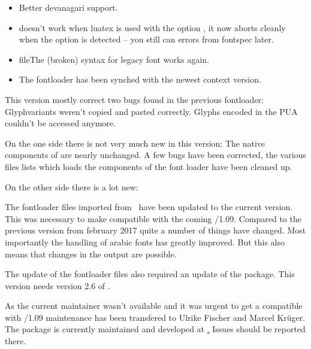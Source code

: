 
\begin{itemize}

  \item Better devanagari support. 
  \item {} doesn't work when luatex is used with the option , it now aborts cleanly when the option is detected -- you still can errors from fontspec later.
  \item  {file}The (broken) syntax  for legacy font works again. 
  \item The fontloader has been synched with the newest context version.
\end{itemize}  
\endsection
{}

This version mostly correct two bugs found in the previous fontloader: Glyphvariants weren't copied and pasted correctly. Glyphs encoded in the PUA couldn't be accessed anymore.

\endsection



On the one side there is not very much new in this version: The native components of  are nearly unchanged. A few bugs have been corrected, the various files lists which loads the components of the font loader have been cleaned up.

On the other side there is a lot new:

\begindescriptions

   The fontloader files imported from \CONTEXT\ have been updated to the current version.
   This was necessary to make  compatible with the coming /1.09. Compared to the previous version from february 2017 quite a number of things have changed. Most importantly the handling of arabic fonts has greatly improved. But this also means that changes in the output are possible.
  \endaltitem

   The update of the fontloader files also required an update of the  package. This  version needs version 2.6 of .
  \endaltitem

   As the current maintainer wasn't available and it was urgent to get a  compatible with /1.09 maintenance has been transfered to Ulrike Fischer and Marcel Krüger. The package is currently maintained and developed at \hyperlink{https://github.com/u-fischer/luaotfload}. Issues should be reported there.
  \endaltitem

